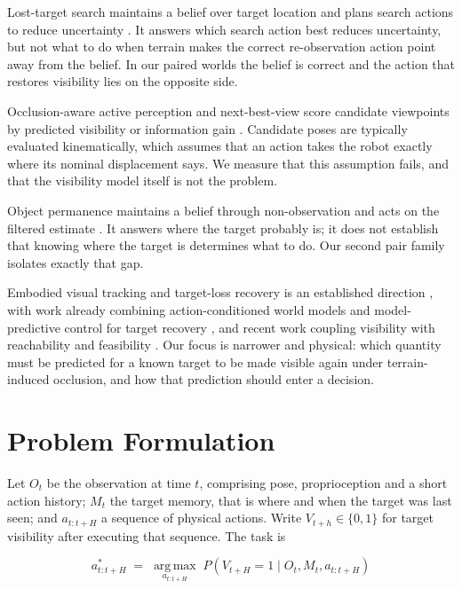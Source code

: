 \documentclass[conference]{IEEEtran}
\begin{document}
Lost-target search maintains a belief over target location and plans search actions to
reduce uncertainty \cite{RadmardCroft2016,Radmard2018}. It answers which search action
best reduces uncertainty, but not what to do when terrain makes the correct
re-observation action point away from the belief. In our paired worlds the belief is
correct and the action that restores visibility lies on the opposite side.

Occlusion-aware active perception and next-best-view score candidate viewpoints by
predicted visibility or information gain \cite{OANBV,LEAPNBV}. Candidate poses are
typically evaluated kinematically, which assumes that an action takes the robot
exactly where its nominal displacement says. We measure that this assumption fails,
and that the visibility model itself is not the problem.

Object permanence maintains a belief through non-observation and acts on the filtered
estimate \cite{Peng2024}. It answers where the target probably is; it does not
establish that knowing where the target is determines what to do. Our second pair
family isolates exactly that gap.

Embodied visual tracking and target-loss recovery is an established direction
\cite{TrackVLA,EVTBench}, with work already combining action-conditioned world models
and model-predictive control for target recovery \cite{CSTWM}, and recent work
coupling visibility with reachability and feasibility \cite{VisibleReachable}. Our
focus is narrower and physical: which quantity must be predicted for a known target to
be made visible again under terrain-induced occlusion, and how that prediction should
enter a decision.

\section{Problem Formulation}

Let $O_t$ be the observation at time $t$, comprising pose, proprioception and a short
action history; $M_t$ the target memory, that is where and when the target was last
seen; and $a_{t:t+H}$ a sequence of physical actions. Write $V_{t+h} \in \{0,1\}$ for
target visibility after executing that sequence. The task is

\begin{equation}
a^{*}_{t:t+H} \;=\; \operatorname*{arg\,max}_{a_{t:t+H}}\;
P\!\left(V_{t+H}=1 \mid O_t, M_t, a_{t:t+H}\right)
\label{eq:objective}
\end{equation}
\end{document}
